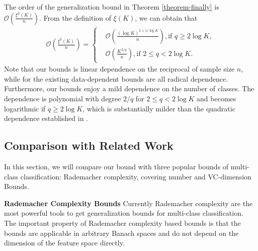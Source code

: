 \documentclass{article}
\begin{document}
The order of the  generalization bound in Theorem \ref{theorem-finally} is
$
 \mathcal{O}\left(\frac{\xi^2(K)}{n}\right).
$
From the definition of $\xi(K)$, we can obtain that
 \begin{align*}
  \mathcal{O}\left(\frac{\xi^2(K)}{n}\right)=
  \left\{
      \begin{aligned}
      &\mathcal{O}\left(\frac{(\log K)^{2+{1}/{\log K}}}{n}\right), \text{if } q\geq 2\log K,\\
      &\mathcal{O}\left(\frac{K^{2/q}}{n}\right), \text{if } 2\leq q< 2\log K.
      \end{aligned}
      \right.
  \end{align*}
  Note that our bounds is linear dependence on the reciprocal of sample size $n$,
  while for the existing data-dependent bounds are all radical dependence.
Furthermore,
  our bounds enjoy a mild dependence on the number of classes.
  The dependence is polynomial with degree $2/q$ for $2\leq q < 2\log K$ and
  becomes logarithmic if $q \geq 2\log K$,
  which is substantially milder than the quadratic dependence
  established in \cite{koltchinskii2002empirical,koltchinskii2001some,mohri2012foundations,cortes2013multi}.


\subsection{Comparison with Related Work}
In this section, we will compare our bound with three popular bounds of multi-class classification:
 Rademacher complexity, covering number and VC-dimension Bounds.

\textbf{Rademacher Complexity Bounds}
Currently Rademacher complexity are the most powerful tools to get generalization bounds for
multi-class classification.
The important property of Rademacher complexity based bounds is that the
bounds are applicable in arbitrary Banach spaces and do not depend on the dimension of the feature
space directly.
\end{document}
